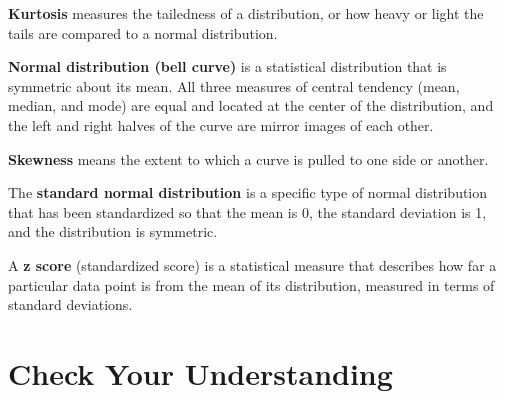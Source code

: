 \documentclass[
  letterpaper,
  DIV=11,
  numbers=noendperiod]{scrreprt}
\begin{document}
\textbf{Kurtosis} measures the tailedness of a distribution, or how
heavy or light the tails are compared to a normal distribution.

\textbf{Normal distribution (bell curve)} is a statistical distribution
that is symmetric about its mean. All three measures of central tendency
(mean, median, and mode) are equal and located at the center of the
distribution, and the left and right halves of the curve are mirror
images of each other.

\textbf{Skewness} means the extent to which a curve is pulled to one
side or another.

The \textbf{standard normal distribution} is a specific type of normal
distribution that has been standardized so that the mean is 0, the
standard deviation is 1, and the distribution is symmetric.

A \textbf{z score} (standardized score) is a statistical measure that
describes how far a particular data point is from the mean of its
distribution, measured in terms of standard deviations.

\section*{Check Your Understanding}\label{check-your-understanding-4}

\end{document}
